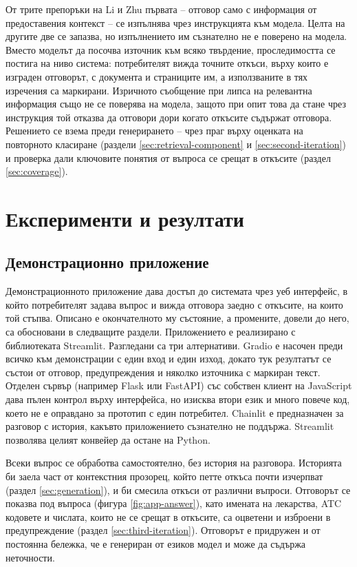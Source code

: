 \documentclass[12pt,a4paper]{article}
\makeatletter
\let\origsection\section
\renewcommand{\section}{\clearpage\origsection}
\renewcommand\paragraph{\@startsection{paragraph}{4}{\z@}{1.5ex \@plus .5ex \@minus .2ex}{-1em}{\normalfont\normalsize\bfseries}}
\makeatother
\begin{document}
От трите препоръки на Li и Zhu \cite{li2026medicalragindustry} първата -- отговор само с информация от предоставения контекст -- се изпълнява чрез инструкцията към модела. Целта на другите две се запазва, но изпълнението им съзнателно не е поверено на модела. Вместо моделът да посочва източник към всяко твърдение, проследимостта се постига на ниво система: потребителят вижда точните откъси, върху които е изграден отговорът, с документа и страниците им, а използваните в тях изречения са маркирани. Изричното съобщение при липса на релевантна информация също не се поверява на модела, защото при опит това да стане чрез инструкция той отказва да отговори дори когато откъсите съдържат отговора. Решението се взема преди генерирането -- чрез праг върху оценката на повторното класиране (раздели \ref{sec:retrieval-component} и \ref{sec:second-iteration}) и проверка дали ключовите понятия от въпроса се срещат в откъсите (раздел \ref{sec:coverage}).

\section{Експерименти и резултати}

\subsection{Демонстрационно приложение}
\label{sec:demo-app}
Демонстрационното приложение дава достъп до системата чрез уеб интерфейс, в който потребителят задава въпрос и вижда отговора заедно с откъсите, на които той стъпва. Описано е окончателното му състояние, а промените, довели до него, са обосновани в следващите раздели. Приложението е реализирано с библиотеката Streamlit. Разгледани са три алтернативи. Gradio е насочен преди всичко към демонстрации с един вход и един изход, докато тук резултатът се състои от отговор, предупреждения и няколко източника с маркиран текст. Отделен сървър (например Flask или FastAPI) със собствен клиент на JavaScript дава пълен контрол върху интерфейса, но изисква втори език и много повече код, което не е оправдано за прототип с един потребител. Chainlit е предназначен за разговор с история, какъвто приложението съзнателно не поддържа. Streamlit позволява целият конвейер да остане на Python.

\paragraph{Интерфейс.} Всеки въпрос се обработва самостоятелно, без история на разговора. Историята би заела част от контекстния прозорец, който петте откъса почти изчерпват (раздел \ref{sec:generation}), и би смесила откъси от различни въпроси. Отговорът се показва под въпроса (фигура \ref{fig:app-answer}), като имената на лекарства, ATC кодовете и числата, които не се срещат в откъсите, са оцветени и изброени в предупреждение (раздел \ref{sec:third-iteration}). Отговорът е придружен и от постоянна бележка, че е генериран от езиков модел и може да съдържа неточности.
\end{document}

